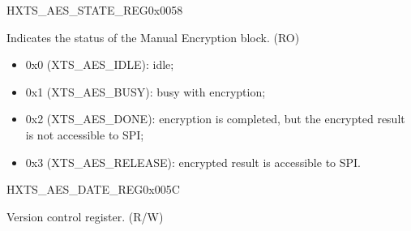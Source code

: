 \begin{register}{H}{XTS\_AES\_STATE\_REG}{0x0058}\label{regdesc:XTSAESSTATEREG}
%
%
\regnewline%
\begin{regdesc}\begin{reglist}
\item [XTS\_AES\_STATE] Indicates the status of the Manual Encryption block. (RO)
    \begin{itemize}
        \item 0x0 (XTS\_AES\_IDLE): idle;
        \item 0x1 (XTS\_AES\_BUSY): busy with encryption;
        \item 0x2 (XTS\_AES\_DONE): encryption is completed, but the encrypted result is not accessible to SPI;
        \item 0x3 (XTS\_AES\_RELEASE): encrypted result is accessible to SPI.
    \end{itemize}
\end{reglist}\end{regdesc}
\end{register}


\begin{register}{H}{XTS\_AES\_DATE\_REG}{0x005C}\label{regdesc:XTSAESDATEREG}
%
%
\regnewline%
\begin{regdesc}\begin{reglist}
\item [XTS\_AES\_DATE] Version control register. (R/W)
\end{reglist}\end{regdesc}
\end{register}


